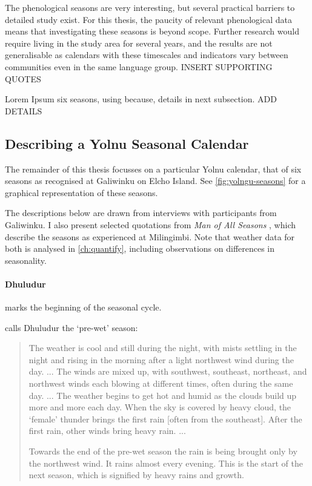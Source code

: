 The phenological seasons are very interesting, but several practical barriers to detailed study exist.
For this thesis, the paucity of relevant phenological data means that
investigating these seasons is beyond scope.
Further research would require living in the study area for several years,
and the results are not generalisable as calendars with these timescales and indicators
vary between communities even in the same language group.  INSERT SUPPORTING QUOTES


Lorem Ipsum six seasons, using because, details in next subsection.  ADD DETAILS



\subsection{Describing a Yolnu Seasonal Calendar}

The remainder of this thesis focusses on a particular Yolnu calendar,
that of six seasons as recognised at Galiwinku on Elcho Island.
See \autoref{fig:yolngu-seasons} for a graphical representation of these seasons.

The descriptions below are drawn from interviews with participants from Galiwinku.
I also present selected quotations from \textit{Man of All Seasons} \citep{davis1989},
which describe the seasons as experienced at Milingimbi.
Note that weather data for both is analysed in \autoref{ch:quantify},
including observations on differences in seasonality.


\paragraph{Dhuludur} marks the beginning of the seasonal cycle.

\citet{davis1989} calls Dhuludur the `pre-wet' season:
\blockquote{
    The weather is cool and still during the night, with mists settling in the night and rising in the morning after a light northwest wind during the day. ...
    The winds are mixed up, with southwest, southeast, northeast, and northwest winds each blowing at different times, often during the same day. ...
    The weather begins to get hot and humid as the clouds build up more and more each day.
    When the sky is covered by heavy cloud, the `female' thunder brings the first rain [often from the southeast].
    After the first rain, other winds bring heavy rain. ...
    
    Towards the end of the pre-wet season the rain is being brought only by the northwest wind.
    It rains almost every evening.
    This is the start of the next season, which is signified by heavy rains and growth.
}

